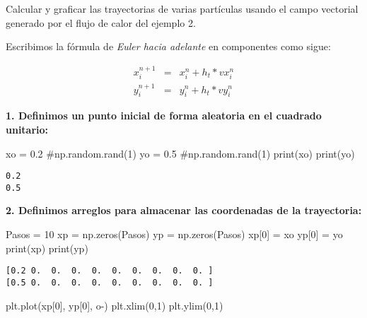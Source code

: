 \documentclass[
  letterpaper,
  DIV=11,
  numbers=noendperiod]{scrreprt}
\newenvironment{Shaded}{\begin{snugshade}}{\end{snugshade}}
\newcommand{\BuiltInTok}[1]{\textcolor[rgb]{0.00,0.23,0.31}{#1}}
\newcommand{\CommentTok}[1]{\textcolor[rgb]{0.37,0.37,0.37}{#1}}
\newcommand{\DecValTok}[1]{\textcolor[rgb]{0.68,0.00,0.00}{#1}}
\newcommand{\FloatTok}[1]{\textcolor[rgb]{0.68,0.00,0.00}{#1}}
\newcommand{\NormalTok}[1]{\textcolor[rgb]{0.00,0.23,0.31}{#1}}
\newcommand{\OperatorTok}[1]{\textcolor[rgb]{0.37,0.37,0.37}{#1}}
\newcommand{\StringTok}[1]{\textcolor[rgb]{0.13,0.47,0.30}{#1}}
\begin{document}
Calcular y graficar las trayectorias de varias partículas usando el
campo vectorial generado por el flujo de calor del ejemplo 2.

Escribimos la fórmula de \emph{Euler hacia adelante} en componentes como
sigue:

\[
\begin{eqnarray}
x_i^{n+1} & = & x_i^{n} + h_t * vx_{i}^n \\
y_i^{n+1} & = & y_i^{n} + h_t * vy_{i}^n 
\end{eqnarray}
\]

\textbf{1. Definimos un punto inicial de forma aleatoria en el cuadrado
unitario:}

\begin{Shaded}
\begin{Highlighting}[]
\NormalTok{xo }\OperatorTok{=} \FloatTok{0.2} \CommentTok{\#np.random.rand(1)}
\NormalTok{yo }\OperatorTok{=} \FloatTok{0.5} \CommentTok{\#np.random.rand(1)}
\BuiltInTok{print}\NormalTok{(xo)}
\BuiltInTok{print}\NormalTok{(yo)}
\end{Highlighting}
\end{Shaded}

\begin{verbatim}
0.2
0.5
\end{verbatim}

\textbf{2. Definimos arreglos para almacenar las coordenadas de la
trayectoria:}

\begin{Shaded}
\begin{Highlighting}[]
\NormalTok{Pasos }\OperatorTok{=} \DecValTok{10}
\NormalTok{xp }\OperatorTok{=}\NormalTok{ np.zeros(Pasos)}
\NormalTok{yp }\OperatorTok{=}\NormalTok{ np.zeros(Pasos)}
\NormalTok{xp[}\DecValTok{0}\NormalTok{] }\OperatorTok{=}\NormalTok{ xo}
\NormalTok{yp[}\DecValTok{0}\NormalTok{] }\OperatorTok{=}\NormalTok{ yo}
\BuiltInTok{print}\NormalTok{(xp)}
\BuiltInTok{print}\NormalTok{(yp)}
\end{Highlighting}
\end{Shaded}

\begin{verbatim}
[0.2 0.  0.  0.  0.  0.  0.  0.  0.  0. ]
[0.5 0.  0.  0.  0.  0.  0.  0.  0.  0. ]
\end{verbatim}

\begin{Shaded}
\begin{Highlighting}[]
\NormalTok{plt.plot(xp[}\DecValTok{0}\NormalTok{], yp[}\DecValTok{0}\NormalTok{], }\StringTok{\textquotesingle{}o{-}\textquotesingle{}}\NormalTok{)}
\NormalTok{plt.xlim(}\DecValTok{0}\NormalTok{,}\DecValTok{1}\NormalTok{)}
\NormalTok{plt.ylim(}\DecValTok{0}\NormalTok{,}\DecValTok{1}\NormalTok{)}
\end{Highlighting}
\end{Shaded}
\end{document}
